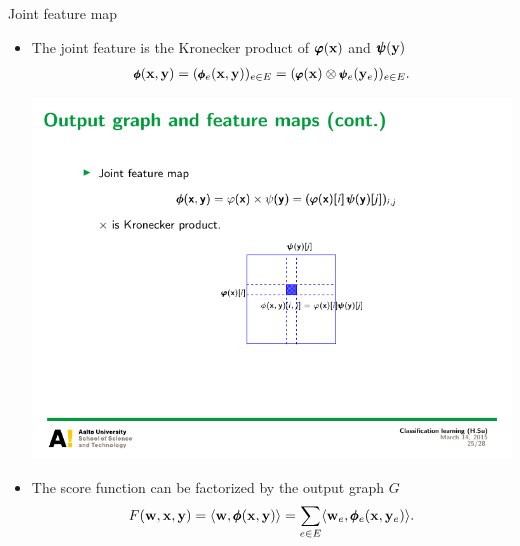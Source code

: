 \documentclass[first=dgreen,second=purple,logo=yellowexc]{aaltoslides}
\begin{document}
%
\begin{frame}{Joint feature map}
	\begin{itemize}\footnotesize
		\item The joint feature is the Kronecker product of $\pmb \varphi(\mathbf {x})$ and $\pmb \psi(\mathbf {y})$
		\begin{align*}\footnotesize
			\pmb \phi(\mathbf {x},\mathbf {y}) = (\pmb \phi_e(\mathbf {x},\mathbf {y}))_{e\in E}=(\pmb \varphi(\mathbf {x})\otimes\pmb \psi_e(\mathbf {y}_e))_{e\in E}.
		\end{align*}
		\begin{center}
			\includegraphics[scale = 1]{./figures/tensor_label.pdf}
		\end{center}
		\item The score function can be factorized by the output graph $G$
		\begin{align*}
			F(\mathbf {w},\mathbf {x},\mathbf {y}) = \langle \mathbf {w}, \pmb \phi(\mathbf {x},\mathbf {y}) \rangle = \sum_{e\in E}\langle \mathbf {w}_e, \pmb \phi_e(\mathbf {x},\mathbf {y}_e) \rangle.
		\end{align*}
	\end{itemize}
\end{frame}
\end{document}
